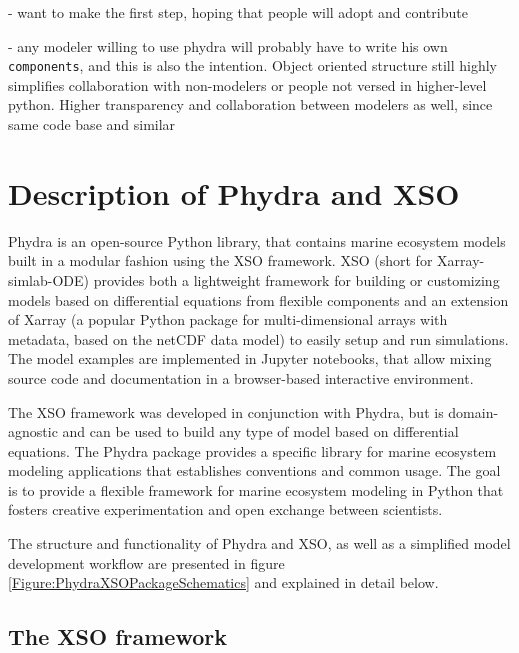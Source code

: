 \documentclass[journal abbreviation, manuscript]{copernicus}
\begin{document}
- want to make the first step, hoping that people will adopt and contribute

- any modeler willing to use phydra will probably have to write his own \texttt{components}, and this is also the intention. Object oriented structure still highly simplifies collaboration with non-modelers or people not versed in higher-level python. Higher transparency and collaboration between modelers as well, since same code base and similar 




\section{Description of Phydra and XSO} \label{Section:phydrapackage}

Phydra is an open-source Python library, that contains marine ecosystem models built in a modular fashion using the XSO framework. XSO (short for Xarray-simlab-ODE) provides both a lightweight framework for building or customizing models based on differential equations from flexible components and an extension of Xarray (a popular Python package for multi-dimensional arrays with metadata, based on the netCDF data model) to easily setup and run simulations. The model examples are implemented in Jupyter notebooks, that allow mixing source code and documentation in a browser-based interactive environment. 

The XSO framework was developed in conjunction with Phydra, but is domain-agnostic and can be used to build any type of model based on differential equations. The Phydra package provides a specific library for marine ecosystem modeling applications that establishes conventions and common usage. The goal is to provide a flexible framework for marine ecosystem modeling in Python that fosters creative experimentation and open exchange between scientists.

The structure and functionality of Phydra and XSO, as well as a simplified model development workflow are presented in figure \ref{Figure:PhydraXSOPackageSchematics} and explained in detail below.

\subsection{The XSO framework} \label{Section:XSOFramework}
\end{document}
